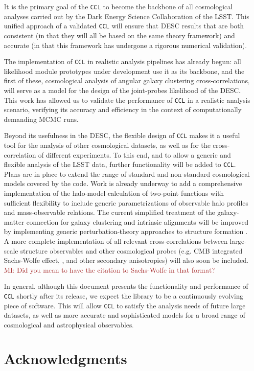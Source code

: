\documentclass[\docopts]{\docclass}
\newcommand{\damonge}[1]{\textcolor{green!55!blue}{DA: #1}}
\newcommand{\mi}[1]{\textcolor{brown}{MI: #1}}
\newcommand{\ccl}{{\tt CCL}\xspace}
\begin{document}
It is the primary goal of the \ccl to become the backbone of all cosmological analyses carried out by the Dark Energy Science Collaboration of the LSST. This unified approach of a validated \ccl will ensure that DESC results that are both consistent (in that they will all be based on the same theory framework) and accurate (in that this framework has undergone a rigorous numerical validation).

The implementation of \ccl in realistic analysis pipelines has already begun: all likelihood module prototypes under development use it as its backbone, and the first of these, cosmological analysis of angular galaxy clustering cross-correlations, will serve as a model for the design of the joint-probes likelihood of the DESC. This work has allowed us to validate the performance of \ccl in a realistic analysis scenario, verifying its accuracy and efficiency in the context of computationally demanding MCMC runs. %

Beyond its usefulness in the DESC, the flexible design of \ccl makes it a useful tool for the analysis of other cosmological datasets, as well as for the cross-correlation of different experiments. To this end, and to allow a generic and flexible analysis of the LSST data, further functionality will be added to \ccl. Plans are in place to extend the range of standard and non-standard cosmological models covered by the code. Work is already underway to add a comprehensive implementation of the halo-model calculation of two-point functions \citep{Peacock2000} with sufficient flexibility to include generic parametrizations of observable halo profiles and mass-observable relations. The current simplified treatment of the galaxy-matter connection for galaxy clustering and intrinsic alignments will be improved by implementing generic perturbation-theory approaches to structure formation \citep{2009JCAP...08..020M,FASTPT}. A more complete implementation of all relevant cross-correlations between large-scale structure observables and other cosmological probes (e.g. CMB integrated Sachs-Wolfe effect, \citealt{1967ApJ...147...73S}, and other secondary anisotropies) will also soon be included. \mi{Did you mean to have the citation to Sachs-Wolfe in that format?}

In general, although this document presents the functionality and performance of \ccl shortly after its release, we expect the library to be a continuously evolving piece of software. This will allow \ccl to satisfy the analysis needs of future large datasets, as well as more accurate and sophisticated models for a broad range of cosmological and astrophysical observables.

\section*{Acknowledgments}

\vskip 5pt


\vskip 5pt



\end{document}
